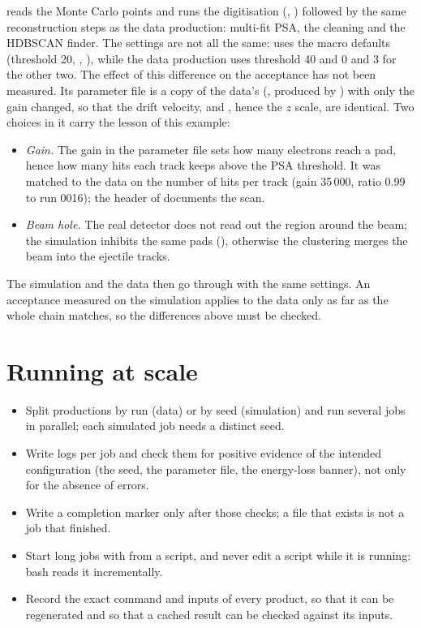  reads the Monte Carlo points and runs the digitisation (,
) followed by the same reconstruction steps as the data production: multi-fit PSA, the
 cleaning and the HDBSCAN finder. The settings are not all the same: 
uses the macro defaults (threshold 20, , ), while the data
production uses threshold 40 and 0 and 3 for the other two. The effect of this difference on the acceptance has not been
measured. Its parameter file is a copy of the data's
(, produced by ) with only the gain changed,
so that the drift velocity,  and , hence the $z$ scale, are identical. Two choices in it carry the lesson of this
example:
\begin{itemize}
\item \emph{Gain.} The gain in the parameter file sets how many electrons reach a pad, hence how many hits each track
  keeps above the PSA threshold. It was matched to the data on the number of hits per track (gain 35\,000, ratio 0.99
  to run 0016); the header of  documents the scan.
\item \emph{Beam hole.} The real detector does not read out the region around the beam; the simulation inhibits the
  same pads (), otherwise the clustering merges the beam into the ejectile tracks.
\end{itemize}
The simulation and the data then go through  with the same settings. An acceptance
measured on the simulation applies to the data only as far as the whole chain matches, so the differences above must be
checked.

\section{Running at scale}

\begin{itemize}
\item Split productions by run (data) or by seed (simulation) and run several jobs in parallel; each simulated job
  needs a distinct seed.
\item Write logs per job and check them for positive evidence of the intended configuration (the seed, the
  parameter file, the energy-loss banner), not only for the absence of errors.
\item Write a completion marker only after those checks; a file that exists is not a job that finished.
\item Start long jobs with  from a script, and never edit a script while it is running: bash reads it
  incrementally.
\item Record the exact command and inputs of every product, so that it can be regenerated and so that a cached result
  can be checked against its inputs.
\end{itemize}
